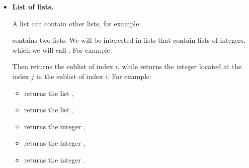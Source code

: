 \documentclass[11pt,class=report,crop=false]{standalone}
\begin{document}
\begin{cours}
\begin{itemize}
	 
  
  \item \textbf{List of lists.}
  
  
  A list can contain other lists, for example:  
  
   contains two lists. 
  We will be interested in lists that contain lists of integers, which we will call . For example:   
  
  Then  returns the sublist of index $i$, while
   returns the integer located at the index $j$ in the sublist of index $i$. For example:
  \begin{itemize}
  \item {} returns the list \ci{[2,14,5]},
  \item {} returns the list \ci{[3,5,7]},
  \item {} returns the integer ,
  \item {} returns the integer ,
  \item {} returns the integer .
\end{itemize}

\end{itemize}
\end{cours}


\end{document}

